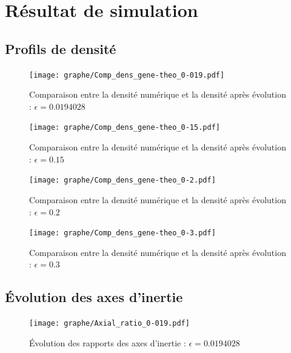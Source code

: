 %		

\section{Résultat de simulation}
\subsection{Profils de densité}
\begin{figure}[h!]
	\centering \texttt{[image: graphe/Comp\_dens\_gene-theo\_0-019.pdf]}
	\caption{Comparaison entre la densité numérique et la densité après évolution : $\epsilon = 0.0194028$\label{soft::0.019}}
\end{figure}


\begin{figure}[h!]
	\centering \texttt{[image: graphe/Comp\_dens\_gene-theo\_0-15.pdf]}
	\caption{Comparaison entre la densité numérique et la densité après évolution : $\epsilon = 0.15$\label{soft::0.15}}
\end{figure}


\begin{figure}[h!]
	\centering \texttt{[image: graphe/Comp\_dens\_gene-theo\_0-2.pdf]}
	\caption{Comparaison entre la densité numérique et la densité après évolution : $\epsilon = 0.2$\label{soft::0.2}}
\end{figure}


\begin{figure}[h!]
	\centering \texttt{[image: graphe/Comp\_dens\_gene-theo\_0-3.pdf]}
	\caption{Comparaison entre la densité numérique et la densité après évolution : $\epsilon = 0.3$\label{soft::0.3}}
\end{figure}

	\FloatBarrier

\subsection{Évolution des axes d'inertie}
\begin{figure}[h!]
	\centering \texttt{[image: graphe/Axial\_ratio\_0-019.pdf]}
	\caption{Évolution des rapports des axes d'inertie : $\epsilon = 0.0194028$\label{soft::0.019-Ax}}
\end{figure}


